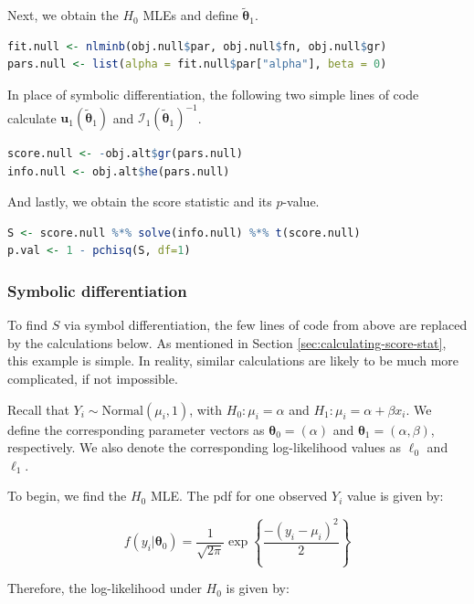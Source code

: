 \documentclass{article}
\newcommand{\thetaZero}{\boldsymbol{\theta}_0}
\newcommand{\thetaOne}{\boldsymbol{\theta}_1}
\newcommand{\thetaOneTilde}{\tilde{\boldsymbol{\theta}}_1}
\newcommand{\scoreU}{\boldsymbol{u}_1 (\thetaOneTilde)}
\newcommand{\scoreI}{\mathcal{I}_1 (\thetaOneTilde)}
\newcommand{\lr}[1]{\left( #1 \right)}
\newcommand{\lrbr}[1]{\left\{ #1 \right\}}
\newcommand{\ellZero}{\ell_0}
\newcommand{\ellOne}{\ell_1}
\newcommand{\betaZero}{\alpha} %
\newcommand{\betaOne}{\beta} %
\begin{document}
Next, we obtain the $H_0$ MLEs and define $\thetaOneTilde$. 

\begin{lstlisting}[language=R]
fit.null <- nlminb(obj.null$par, obj.null$fn, obj.null$gr)
pars.null <- list(alpha = fit.null$par["alpha"], beta = 0)
\end{lstlisting}

In place of symbolic differentiation, the following two simple lines of code
calculate $\scoreU$ and $\scoreI^{-1}$. 

\begin{lstlisting}[language=R]
score.null <- -obj.alt$gr(pars.null)
info.null <- obj.alt$he(pars.null)
\end{lstlisting}

And lastly, we obtain the score statistic and its $p$-value. 

\begin{lstlisting}[language=R]
S <- score.null %*% solve(info.null) %*% t(score.null)
p.val <- 1 - pchisq(S, df=1)
\end{lstlisting}

\subsubsection*{Symbolic differentiation}
\label{sec:symb-diff-appendix}

To find $S$ via symbol differentiation, the few lines of code from above
are replaced by the calculations below. As mentioned in Section
\ref{sec:calculating-score-stat}, this example is simple. In reality,
similar calculations are likely to be much more complicated, if not
impossible. 

Recall that $Y_i \sim \text{Normal}(\mu_i,
1)$, with $H_0: \mu_i = \alpha$ and $H_1: \mu_i =
\alpha + \beta x_i$. We define the corresponding parameter
vectors as $\thetaZero = \lr{\betaZero}$ and $\thetaOne = \lr{\betaZero,
  \betaOne}$, respectively. We also denote the corresponding
log-likelihood values as $\ellZero$ and $\ellOne$.

To begin, we find the $H_0$ MLE. The pdf for one observed $Y_i$ value is
given by:

\begin{equation*}
  f \left(y_i |  \thetaZero \right) = \frac{1}{\sqrt{2 \pi}} \exp
  \lrbr{\frac{-(y_i - \mu_i)^2}{2}}
\end{equation*}

Therefore, the log-likelihood under $H_0$ is given by: 
\end{document}
